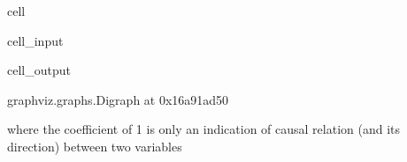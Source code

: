 \documentclass[letterpaper,10pt,english]{jupyterBook}
\begin{document}
\begin{sphinxuseclass}{cell}\begin{sphinxVerbatimInput}

\begin{sphinxuseclass}{cell_input}
\begin{sphinxVerbatim}[commandchars=\\\{\}]
   

  \PYG{p}{[}
    \PYG{p}{[}  \PYG{p}{]}   
    \PYG{p}{[}  \PYG{p}{]}   
    \PYG{p}{[}  \PYG{p}{]}    
\PYG{p}{]}

 \PYG{p}{[}  \PYG{p}{]}
\end{sphinxVerbatim}

\end{sphinxuseclass}\end{sphinxVerbatimInput}
\begin{sphinxVerbatimOutput}

\begin{sphinxuseclass}{cell_output}
\begin{sphinxVerbatim}[commandchars=\\\{\}]
\PYGZlt{}graphviz.graphs.Digraph at 0x16a91ad50\PYGZgt{}
\end{sphinxVerbatim}

\end{sphinxuseclass}\end{sphinxVerbatimOutput}

\end{sphinxuseclass}
\sphinxAtStartPar
where the coefficient of 1 is only an indication of causal relation (and its direction) between two variables
\end{document}
